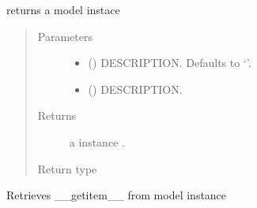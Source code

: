 \documentclass[letterpaper,10pt,english]{sphinxmanual}
\begin{document}
\begin{fulllineitems}
\begin{fulllineitems}
\label{\detokenize{index:modelmf.mf.__call__}}
\pysigstartsignatures
{}
\pysigstopsignatures
\sphinxAtStartPar
returns a model instace
\begin{quote}\begin{description}
\item[{Parameters}] \leavevmode\begin{itemize}
\item {} 
\sphinxAtStartPar
{} (\sphinxstyleliteralemphasis{\sphinxupquote{, }}) \textendash{} DESCRIPTION. Defaults to ‘’.

\item {} 
\sphinxAtStartPar
{} () \textendash{} DESCRIPTION.

\end{itemize}

\item[{Returns}] \leavevmode
\sphinxAtStartPar
a instance .

\item[{Return type}] \leavevmode
\sphinxAtStartPar
{\hyperref[\detokenize{index:modelclass.model}]{}}

\end{description}\end{quote}

\end{fulllineitems}


\begin{fulllineitems}
\label{\detokenize{index:modelmf.mf.__getitem__}}
\pysigstartsignatures
{}
\pysigstopsignatures
\sphinxAtStartPar
Retrieves  \_\_getitem\_\_ from model instance

\end{fulllineitems}


\end{fulllineitems}
\end{document}
